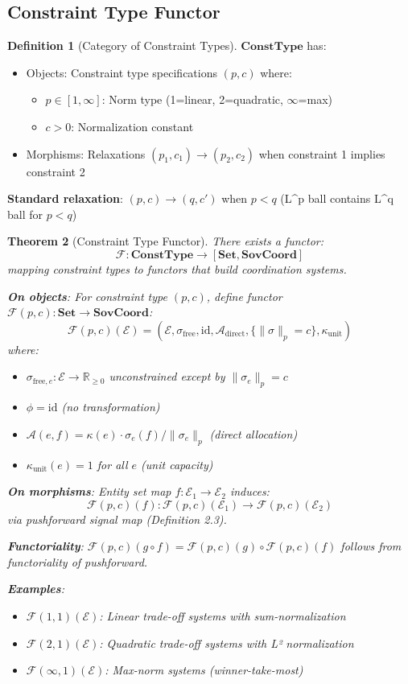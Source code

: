 \documentclass[11pt,a4paper]{article}
\newtheorem{theorem}{Theorem}[section]
\theoremstyle{definition}
\newtheorem{definition}[theorem]{Definition}
\theoremstyle{remark}
\newcommand{\E}{\mathcal{E}}
\newcommand{\A}{\mathcal{A}}
\newcommand{\SovCoord}{\mathbf{SovCoord}}
\begin{document}
\subsection{Constraint Type Functor}

\begin{definition}[Category of Constraint Types]
$\mathbf{ConstType}$ has:
\begin{itemize}
\item Objects: Constraint type specifications $(p, c)$ where:
  \begin{itemize}
  \item $p \in [1, \infty]$: Norm type (1=linear, 2=quadratic, $\infty$=max)
  \item $c > 0$: Normalization constant
  \end{itemize}
\item Morphisms: Relaxations $(p_1, c_1) \to (p_2, c_2)$ when constraint 1 implies constraint 2
\end{itemize}

\textbf{Standard relaxation}: $(p, c) \to (q, c')$ when $p < q$ (L^p ball contains L^q ball for $p < q$)
\end{definition}

\begin{theorem}[Constraint Type Functor]
There exists a functor:
\[ \mathcal{F}: \mathbf{ConstType} \to [\mathbf{Set}, \SovCoord] \]
mapping constraint types to functors that build coordination systems.

\textbf{On objects}: For constraint type $(p, c)$, define functor $\mathcal{F}(p,c): \mathbf{Set} \to \SovCoord$:
\[ \mathcal{F}(p,c)(\E) = (\E, \sigma_{\text{free}}, \text{id}, \A_{\text{direct}}, \{\|\sigma\|_p = c\}, \kappa_{\text{unit}}) \]
where:
\begin{itemize}
\item $\sigma_{\text{free},e}: \E \to \mathbb{R}_{\ge 0}$ unconstrained except by $\|\sigma_e\|_p = c$
\item $\phi = \text{id}$ (no transformation)
\item $\A(e,f) = \kappa(e) \cdot \sigma_e(f) / \|\sigma_e\|_p$ (direct allocation)
\item $\kappa_{\text{unit}}(e) = 1$ for all $e$ (unit capacity)
\end{itemize}

\textbf{On morphisms}: Entity set map $f: \E_1 \to \E_2$ induces:
\[ \mathcal{F}(p,c)(f): \mathcal{F}(p,c)(\E_1) \to \mathcal{F}(p,c)(\E_2) \]
via pushforward signal map (Definition 2.3).

\textbf{Functoriality}: $\mathcal{F}(p,c)(g \circ f) = \mathcal{F}(p,c)(g) \circ \mathcal{F}(p,c)(f)$ follows from functoriality of pushforward.

\textbf{Examples}:
\begin{itemize}
\item $\mathcal{F}(1, 1)(\E)$: Linear trade-off systems with sum-normalization
\item $\mathcal{F}(2, 1)(\E)$: Quadratic trade-off systems with L² normalization  
\item $\mathcal{F}(\infty, 1)(\E)$: Max-norm systems (winner-take-most)
\end{itemize}
\end{theorem}
\end{document}
